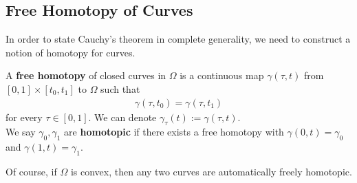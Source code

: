 \documentclass{memoir}
\begin{document}


\subsection{Free Homotopy of Curves}
\label{sub:free_homotopy_of_curves}

In order to state Cauchy's theorem in complete generality, we need to construct a notion of homotopy for curves.

\begin{defn}
	A \textbf{free homotopy} of closed curves in \(\Omega \) is a continuous map \(\gamma(\tau,t)\) from \([0,1]\times [t_0,t_1]\) to \(\Omega \) such that
\begin{align*}
	\gamma(\tau,t_0) = \gamma(\tau,t_1)
\end{align*}
for every \(\tau\in [0,1]\). We can denote \(\gamma_\tau(t) := \gamma(\tau,t)\).\\

We say \(\gamma_0,\gamma_1\) are \textbf{homotopic} if there exists a free homotopy with \(\gamma(0,t) = \gamma_0\) and \(\gamma(1,t) = \gamma_1\).
\end{defn}
Of course, if \(\Omega \) is convex, then any two curves are automatically freely homotopic.


\end{document}
